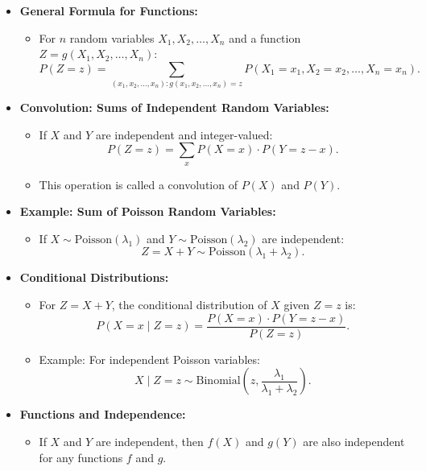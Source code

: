 \documentclass{article}
\begin{document}
\begin{itemize}
  \item \textbf{General Formula for Functions:}
    \begin{itemize}
      \item For $n$ random variables $X_1, X_2, \dots, X_n$ and a function $Z = g(X_1, X_2, \dots, X_n)$:
        \[
          P(Z = z) = \sum_{(x_1, x_2, \dots, x_n): g(x_1, x_2, \dots, x_n) = z} P(X_1 = x_1, X_2 = x_2, \dots, X_n = x_n).
        \]
    \end{itemize}

  \item \textbf{Convolution: Sums of Independent Random Variables:}
    \begin{itemize}
      \item If $X$ and $Y$ are independent and integer-valued:
        \[
          P(Z = z) = \sum_{x} P(X = x) \cdot P(Y = z - x).
        \]
      \item This operation is called a convolution of $P(X)$ and $P(Y)$.
    \end{itemize}

  \item \textbf{Example: Sum of Poisson Random Variables:}
    \begin{itemize}
      \item If $X \sim \text{Poisson}(\lambda_1)$ and $Y \sim \text{Poisson}(\lambda_2)$ are independent:
        \[
          Z = X + Y \sim \text{Poisson}(\lambda_1 + \lambda_2).
        \]
    \end{itemize}

  \item \textbf{Conditional Distributions:}
    \begin{itemize}
      \item For $Z = X + Y$, the conditional distribution of $X$ given $Z = z$ is:
        \[
          P(X = x \mid Z = z) = \frac{P(X = x) \cdot P(Y = z - x)}{P(Z = z)}.
        \]
      \item Example: For independent Poisson variables:
        \[
          X \mid Z = z \sim \text{Binomial}\left(z, \frac{\lambda_1}{\lambda_1 + \lambda_2}\right).
        \]
    \end{itemize}

  \item \textbf{Functions and Independence:}
    \begin{itemize}
      \item If $X$ and $Y$ are independent, then $f(X)$ and $g(Y)$ are also independent for any functions $f$ and $g$.
    \end{itemize}
\end{itemize}
\end{document}
